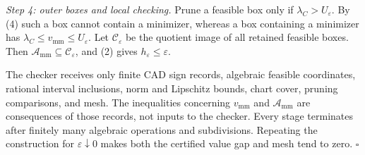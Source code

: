\emph{Step 4: outer boxes and local checking.}
Prune a feasible box only if \(\lambda_C>U_\varepsilon\).  By (4) such a box cannot contain a minimizer, whereas a box containing a minimizer has \(\lambda_C\le v_{\mathrm{mm}}\le U_\varepsilon\).  Let \(\mathcal C_\varepsilon\) be the quotient image of all retained feasible boxes.  Then \(\mathcal A_{\mathrm{mm}}\subseteq\mathcal C_\varepsilon\), and (2) gives \(h_\varepsilon\le\varepsilon\).

The checker receives only finite CAD sign records, algebraic feasible coordinates, rational interval inclusions, norm and Lipschitz bounds, chart cover, pruning comparisons, and mesh.  The inequalities concerning \(v_{\mathrm{mm}}\) and \(\mathcal A_{\mathrm{mm}}\) are consequences of those records, not inputs to the checker.  Every stage terminates after finitely many algebraic operations and subdivisions.  Repeating the construction for \(\varepsilon\downarrow0\) makes both the certified value gap and mesh tend to zero. \(\square\)